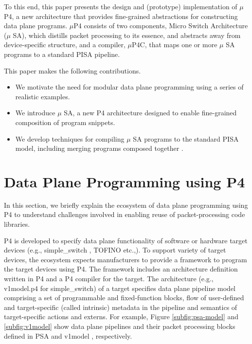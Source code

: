 To this end, this paper presents the design and (prototype)
implementation of $\mu$P4, a new architecture that provides
fine-grained abstractions for constructing data plane programs.
$\mu$P4 consists of two components, Micro Switch Architecture
($\mu$ SA), which distills packet processing to its essence, and
abstracts away from device-specific structure, and a compiler,
$\mu$P4C, that maps one or more $\mu$ SA programs to a standard PISA
pipeline. 

This paper makes the following contributions.
\begin{itemize}
\item We motivate the need for modular data plane programming using a
  series of realistic examples.
\item We introduce $\mu$ SA, a new P4 architecture designed to enable
  fine-grained composition of program snippets.
\item We develop techniques for compiling $\mu$ SA programs to the
  standard PISA model, including merging programs composed together 
  .
\end{itemize}






\section{Data Plane Programming using P4}
In this section, we briefly explain the ecosystem of data plane programming using P4 to understand challenges involved in enabling reuse of packet-processing code libraries.

P4 is developed to specify data plane functionality of software or hardware target devices (e.g., simple\_\-switch \cite{simple_switch.md}, TOFINO \cite{tofino} etc.,).
To support variety of target devices, the ecosystem expects manufacturers to provide a framework to program the target devices using P4.
The framework includes an architecture definition written in P4 and a P4 compiler for the target.
The architecture (e.g., v1model.p4 \cite{v1model.p4} for simple\_switch) of a target specifies data plane pipeline model comprising a set of programmable and fixed-function blocks, flow of user-defined and target-specific (called intrinsic) metadata in the pipeline and semantics of target-specific actions and externs.
For example, Figure \ref{subfig:psa-model} and \ref{subfig:v1model} show data plane pipelines and their packet processing blocks defined in PSA \cite{psa} and v1model \cite{simple_switch.md}, respectively.

